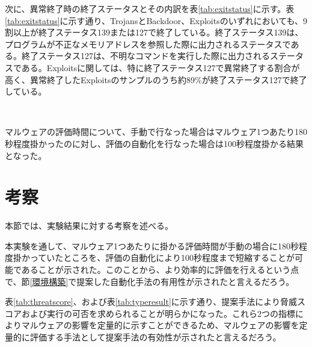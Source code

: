 \documentclass[12pt,a4paper,titlepage,report]{jsbook}
\begin{document}
次に、異常終了時の終了ステータスとその内訳を表\ref{tab:exitstatus}に示す。表\ref{tab:exitstatus}に示す通り、TrojansとBackdoor、Exploitsのいずれにおいても、9割以上が終了ステータス139または127で終了している。終了ステータス139は、プログラムが不正なメモリアドレスを参照した際に出力されるステータスである。終了ステータス127は、不明なコマンドを実行した際に出力されるステータスである。Exploitsに関しては、特に終了ステータス127で異常終了する割合が高く、異常終了したExploitsのサンプルのうち約89\%が終了ステータス127で終了している。

\begin{table}[htbp]
	\caption{異常終了時の終了ステータスとその内訳}
	\label{tab:exitstatus}
	\centering
	\\
\end{table}

マルウェアの評価時間について、手動で行なった場合はマルウェア1つあたり180秒程度掛かったのに対し、評価の自動化を行なった場合は100秒程度掛かる結果となった。

\section{考察}
本節では、実験結果に対する考察を述べる。

本実験を通して、マルウェア1つあたりに掛かる評価時間が手動の場合に180秒程度掛かっていたところを、評価の自動化により100秒程度まで短縮することが可能であることが示された。このことから、より効率的に評価を行えるという点で、節\ref{環境構築}で提案した自動化手法の有用性が示されたと言えるだろう。

表\ref{tab:threatscore}、および表\ref{tab:typeresult}に示す通り、提案手法により脅威スコアおよび実行の可否を求められることが明らかになった。これら2つの指標によりマルウェアの影響を定量的に示すことができるため、マルウェアの影響を定量的に評価する手法として提案手法の有効性が示されたと言えるだろう。
\end{document}
